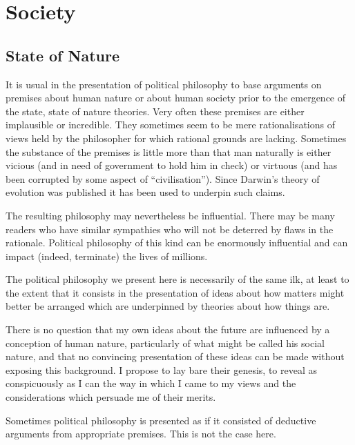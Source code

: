 \chapter{Society}

\section{State of Nature}

It is usual in the presentation of political philosophy to base arguments on premises about human nature or about human society prior to the emergence of the state, state of nature theories.
Very often these premises are either implausible or incredible.
They sometimes seem to be mere rationalisations of views held by the philosopher for which rational grounds are lacking.
Sometimes the substance of the premises is little more than that man naturally is either vicious (and in need of government to hold him in check) or virtuous (and has been corrupted by some aspect of ``civilisation'').
Since Darwin's theory of evolution was published it has been used to underpin such claims.

The resulting philosophy may nevertheless be influential.
There may be many readers who have similar sympathies who will not be deterred by flaws in the rationale.
Political philosophy of this kind can be enormously influential and can impact (indeed, terminate) the lives of millions.

The political philosophy we present here is necessarily of the same ilk, at least to the extent that it consists in the presentation of ideas about how matters might better be arranged which are underpinned by theories about how things are.

There is no question that my own ideas about the future are influenced by a conception of human nature, particularly of what might be called his social nature, and that no convincing presentation of these ideas can be made without exposing this background.
I propose to lay bare their genesis, to reveal as conspicuously as I can the way in which I came to my views and the considerations which persuade me of their merits.

Sometimes political philosophy is presented as if it consisted of deductive arguments from appropriate premises.
This is not the case here.
